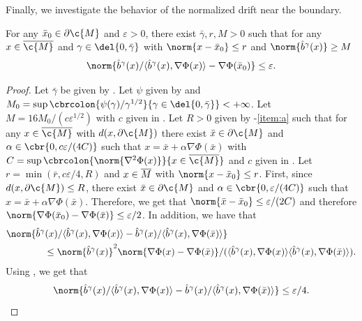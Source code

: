 Finally, we investigate the behavior of the normalized drift near the boundary.

\begin{proposition}
	\label{prop:condition_duo_iv}
	For any $\bar{x}_0 \in \partial \c{M}$ and $\varepsilon >0$, there exist $\bar{\gamma}, r, M >0$ such that for any $x \in \cl{\c{M}}$ and $\gamma \in \del{0, \bar{\gamma}}$ with $\norm{x - \bar{x}_0} \leq r$ and $\norm{\hat{b}^\gamma(x)} \geq M$ \begin{equation} \norm{\hat{b}^\gamma(x)/\langle \hat{b}^\gamma(x), \nabla \Phi(x) \rangle - \nabla \Phi(\bar{x}_0)} \leq \varepsilon .
	\end{equation}
\end{proposition}

\begin{proof}
	Let $\bar{\gamma}$ be given by .
	Let $\psi$ given by  and $M_0 = \sup \cbrcolon{\psi(\gamma)/\gamma^{1/2}}{\gamma \in \del{0, \bar{\gamma}}} < +\infty$.
	Let $M = 16 M_0 / (c\varepsilon^{1/2})$ with $c$ given in .
	Let $R > 0$ given by -\ref{item:a} such that for any $x \in \cl{\c{M}}$ with $d(x, \partial \c{M})$ there exist $\bar{x} \in \partial \c{M}$ and $\alpha \in \cbr{0, c \varepsilon /(4C)}$ such that $x = \bar{x} + \alpha \nabla \Phi(\bar{x})$ with $C = \sup \cbrcolon{\norm{\nabla^2 \Phi(x)}}{x \in \cl{\c{M}}}$ and $c$ given in .
	Let $r = \min(\bar{r}, c \varepsilon/4, R)$ and $x \in \overline{M}$ with $\norm{x - \bar{x}_0} \leq r$.
	First, since $d(x, \partial \c{M}) \leq R$, there exist $\bar{x} \in \partial \c{M}$ and $\alpha \in \cbr{0,\varepsilon/(4C)}$ such that $x = \bar{x} + \alpha \nabla \Phi(\bar{x})$.
	Therefore, we get that $\norm{\bar{x} - \bar{x}_0} \leq \varepsilon/(2C)$ and therefore $\norm{\nabla \Phi(\bar{x}_0) - \nabla \Phi(\bar{x})} \leq \varepsilon /2$.
	In addition, we have that \begin{align}  & \norm{\hat{b}^\gamma(x)/\langle \hat{b}^\gamma(x), \nabla \Phi(x) \rangle - \hat{b}^\gamma(x)/\langle \hat{b}^\gamma(x), \nabla \Phi(\bar{x}) \rangle} \\ & \qquad \qquad \leq \norm{\hat{b}^\gamma(x)}^2 \norm{\nabla \Phi(x) - \nabla \Phi(\bar{x})} / (\langle \hat{b}^\gamma(x), \nabla \Phi(x) \rangle \langle \hat{b}^\gamma(x), \nabla \Phi(\bar{x}) \rangle) .
	\end{align}
	Using , we get that \begin{equation} \norm{\hat{b}^\gamma(x)/\langle \hat{b}^\gamma(x), \nabla \Phi(x) \rangle - \hat{b}^\gamma(x)/\langle \hat{b}^\gamma(x), \nabla \Phi(\bar{x}) \rangle} \leq \varepsilon/4 .

\end{equation}
\end{proof}
